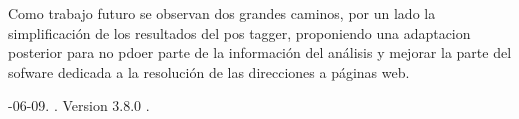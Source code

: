 \documentclass[11pt,a4paper]{article}
\begin{document}
Como trabajo futuro se observan dos grandes caminos, por un lado la simplificación de los resultados del pos tagger, proponiendo una adaptacion posterior para no pdoer parte de la información del análisis y mejorar la parte del sofware dedicada a la resolución de las direcciones a páginas web.

\begin{thebibliography}{}

-06-09.
.
\newblock Version 3.8.0	.

\end{thebibliography}
\end{document}
